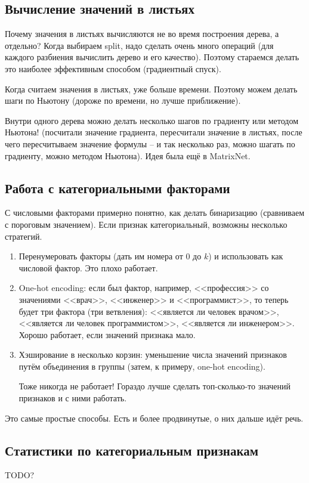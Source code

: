 \documentclass[a4paper,12pt]{article}
\begin{document}
\subsection{Вычисление значений в листьях}

Почему значения в листьях вычисляются не во время построения дерева, а отдельно?
Когда выбираем split, надо сделать очень много операций (для каждого разбиения вычислить дерево и его качество).
Поэтому стараемся делать это наиболее эффективным способом (градиентный спуск).

Когда считаем значения в листьях, уже больше времени.
Поэтому можем делать шаги по Ньютону (дороже по времени, но лучше приближение).

Внутри одного дерева можно делать несколько шагов по градиенту или методом Ньютона! (посчитали значение градиента, пересчитали значение в листьях, после чего пересчитываем значение формулы -- и так несколько раз, можно шагать по градиенту, можно методом Ньютона). Идея была ещё в MatrixNet.

\subsection{Работа с категориальными факторами}

С числовыми факторами примерно понятно, как делать бинаризацию (сравниваем с пороговым значением).
Если признак категориальный, возможны несколько стратегий.
\begin{enumerate}[noitemsep]
    \item Перенумеровать факторы (дать им номера от $0$ до $k$) и использовать как числовой фактор.
    Это плохо работает.
    \item One-hot encoding: если был фактор, например, <<профессия>> со значениями <<врач>>, <<инженер>> и <<программист>>, то теперь будет три фактора (три ветвления): <<является ли человек врачом>>, <<является ли человек программистом>>, <<является ли инженером>>.
    Хорошо работает, если значений признака мало.
    \item Хэширование в несколько корзин: уменьшение числа значений признаков путём объединения в группы (затем, к примеру, one-hot encoding).

    Тоже никогда не работает!
    Гораздо лучше сделать топ-сколько-то значений признаков и с ними работать.
\end{enumerate}

Это самые простые способы. Есть и более продвинутые, о них дальше идёт речь.

\subsection{Статистики по категориальным признакам}

TODO?
\end{document}
